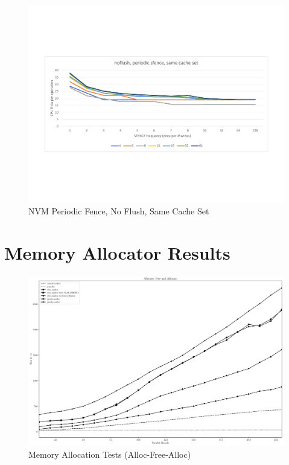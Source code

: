 \begin{figure}
    \centering
    \caption{NVM Periodic Fence, No Flush, Same Cache Set}\label{micro:sfence:noflush:same}
    \includegraphics[scale=0.35]{micro/nvm-noflush-periodic-same.pdf}
\end{figure}

\section{Memory Allocator Results}\label{section:results:malloc}

\begin{figure}
    \centering
    \caption{Memory Allocation Tests (Alloc-Free-Alloc)}\label{plot:afa}
    \includegraphics[scale=0.35]{malloc/alloc_free_alloc.pdf}
\end{figure}


